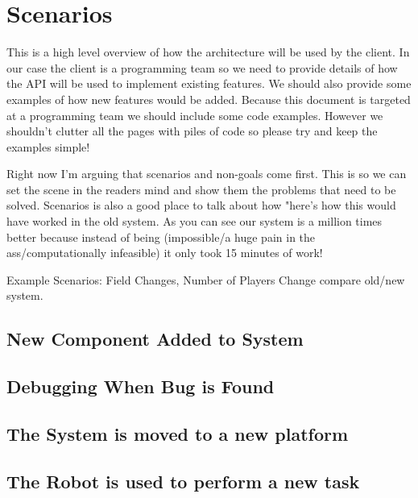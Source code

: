 \documentclass[english,12pt]{scrartcl}
\begin{document}
    \section{Scenarios}
        This is a high level overview of how the architecture will be used by the client. In our
        case the client is a programming team so we need to provide details of how the API will be
        used to implement existing features. We should also provide some examples of how new 
        features would be added. Because this document is targeted at a programming team we should
        include some code examples. However we shouldn't clutter all the pages with piles of code so 
        please try and keep the examples simple!

        Right now I'm arguing that scenarios and non-goals come first. This is so we can set the
        scene in the readers mind and show them the problems that need to be solved. Scenarios is
        also a good place to talk about how "here's how this would have worked in the old system. As
        you can see our system is a million times better because instead of being (impossible/a huge 
        pain in the ass/computationally infeasible) it only took 15 minutes of work!

        Example Scenarios: Field Changes, Number of Players Change compare old/new system.
        
        \subsection{New Component Added to System}
            
        \subsection{Debugging When Bug is Found}
        
        \subsection{The System is moved to a new platform}
            
        \subsection{The Robot is used to perform a new task}
        
\end{document}
